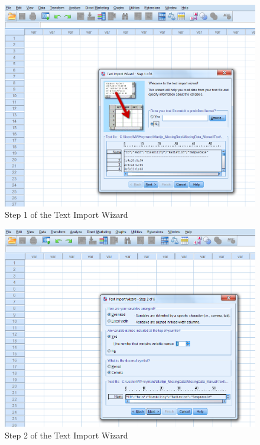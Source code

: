 \documentclass[]{book}
\theoremstyle{definition}
\theoremstyle{definition}
\theoremstyle{definition}
\theoremstyle{remark}
\begin{document}
\begin{figure}

{\centering \includegraphics[width=0.9\linewidth]{images/fig1.19} 

}

\caption{Step 1 of the Text Import Wizard}\label{fig:fig19}
\end{figure}

\begin{figure}

{\centering \includegraphics[width=0.9\linewidth]{images/fig1.20} 

}

\caption{Step 2 of the Text Import Wizard}\label{fig:fig20}
\end{figure}
\end{document}
